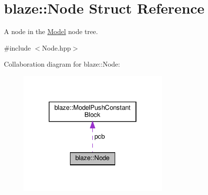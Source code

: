 \hypertarget{structblaze_1_1Node}{}\section{blaze\+:\+:Node Struct Reference}
\label{structblaze_1_1Node}


A node in the \hyperlink{classblaze_1_1Model}{Model} node tree.  




{\ttfamily \#include $<$Node.\+hpp$>$}



Collaboration diagram for blaze\+:\+:Node\+:\nopagebreak
\begin{figure}[H]
\begin{center}
\leavevmode
\includegraphics[width=214pt]{structblaze_1_1Node__coll__graph}
\end{center}
\end{figure}
